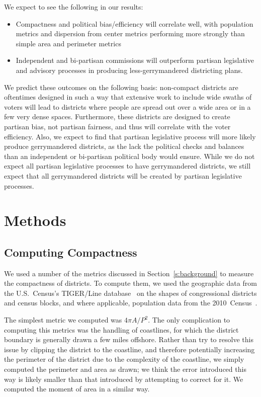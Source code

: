 \documentclass[12pt]{article}
\begin{document}
  We expect to see the following in our results:
  \begin{itemize}
  \item Compactness and political bias/efficiency will correlate well, with population metrics and dispersion from center metrics performing more strongly than simple area and perimeter metrics
  \item Independent and bi-partisan commissions will outperform partisan legislative and advisory processes in producing less-gerrymandered districting plans.
  \end{itemize}

  We predict these outcomes on the following basis: non-compact districts are oftentimes designed in such a way that extensive work to include wide swaths of voters will lead to districts where people are spread out over a wide area or in a few very dense spaces.  Furthermore, these districts are designed to create partisan bias, not partisan fairness, and thus will correlate with the voter efficiency.  Also, we expect to find that partisan legislative process will more likely produce gerrymandered districts, as the lack the political checks and balances than an independent or bi-partisan political body would ensure.  While we do not expect all partisan legislative processes to have gerrymandered districts, we still expect that all gerrymandered districts will be created by partisan legislative processes.

  \section{Methods}

  \subsection{Computing Compactness}

  We used a number of the metrics discussed in Section~\ref{s:background} to measure the compactness of districts.  To compute them, we used the geographic data from the U.S.~Census's TIGER/Line database~\cite{censustiger} on the shapes of congressional districts and census blocks, and where applicable, population data from the 2010~Census~\cite{census2010}.

  The simplest metric we computed was $4\pi A/P^2$.  The only complication to computing this metrics was the handling of coastlines, for which the district boundary is generally drawn a few miles offshore.  Rather than try to resolve this issue by clipping the district to the coastline, and therefore potentially increasing the perimeter of the district due to the complexity of the coastline, we simply computed the perimeter and area as drawn; we think the error introduced this way is likely smaller than that introduced by attempting to correct for it.  We computed the moment of area in a similar way.
\end{document}
